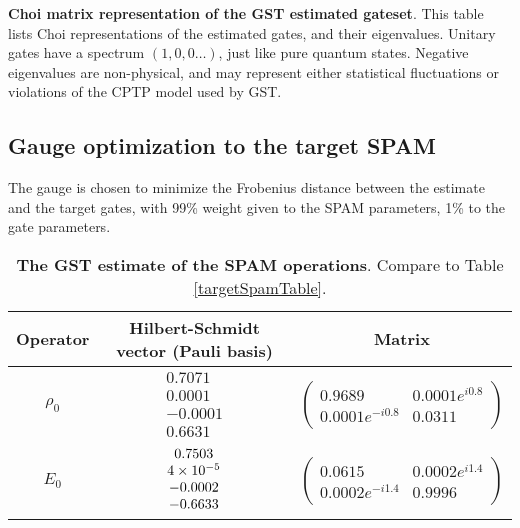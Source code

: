 {\begin{table}[h]
\begin{center}
\caption{\textbf{Choi matrix representation of the GST estimated gateset}.  This table lists Choi representations of the estimated gates, and their eigenvalues.  Unitary gates have a spectrum $(1,0,0\ldots)$, just like pure quantum states.  Negative eigenvalues are non-physical, and may represent either statistical fluctuations or violations of the CPTP model used by GST.\label{bestTargetGatesetChoiTable}}
\end{center}
\end{table}


\clearpage

\subsection{Gauge optimization to the target SPAM}
The gauge is chosen to minimize the Frobenius distance between the estimate and the target gates, with 99\% weight given to the SPAM parameters, 1\% to the gate parameters.

\begin{table}[h]
\begin{center}
\begin{tabular}[l]{|c|c|c|}
\hline
Operator & Hilbert-Schmidt vector (Pauli basis) & Matrix \\ \hline
$\rho_{0}$ & $ \begin{array}{c}
0.7071 \\ 
0.0001 \\ 
-0.0001 \\ 
0.6631
 \end{array} $
 & $ \left(\!\!\begin{array}{cc}
0.9689 & 0.0001e^{i0.8} \\ 
0.0001e^{-i0.8} & 0.0311
 \end{array}\!\!\right) $
 \\ \hline
$E_{0}$ & $ \begin{array}{c}
0.7503 \\ 
4\times 10^{-5} \\ 
-0.0002 \\ 
-0.6633
 \end{array} $
 & $ \left(\!\!\begin{array}{cc}
0.0615 & 0.0002e^{i1.4} \\ 
0.0002e^{-i1.4} & 0.9996
 \end{array}\!\!\right) $
 \\ \hline
\end{tabular}

\caption{\textbf{The GST estimate of the SPAM operations}.  Compare to Table \ref{targetSpamTable}.\label{bestTargetSpamGatesetSpamTable}}
\end{center}
\end{table}

}
